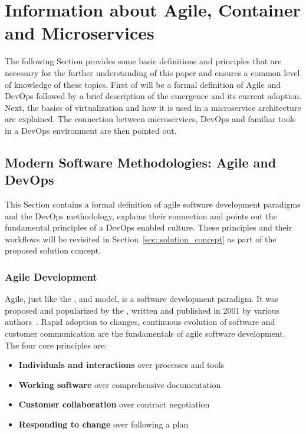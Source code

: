 \documentclass[12pt, a4paper]{article}
\begin{document}
\section{Information about Agile, Container and Microservices}\label{sec::backgrund}
The following Section provides some basic definitions and principles that are necessary for the further understanding of this paper and ensures a common level of knowledge of these topics. First of will be a formal definition of Agile and DevOps followed by a brief description of the emergence and its current adoption. Next, the basics of virtualization and how it is used in a microservice architecture are explained. The connection between microservices, DevOps and familiar tools in a DevOps environment are then pointed out.

    \subsection{Modern Software Methodologies: Agile and DevOps}\label{ssec::devops}
    This Section contains a formal definition of agile software development paradigms and the DevOps methodology, explains their connection and points out the fundamental principles of a DevOps enabled culture. These principles and their workflows will be revisited in Section~\ref{sec::solution_concept} as part of the proposed solution concept.

        \subsubsection{Agile Development}
        Agile, just like the ,  and  model, is a software development paradigm. It was proposed and popularized by the , written and published in 2001 by various authors~\cite{manifesto}. Rapid adoption to changes, continuous evolution of software and customer communication are the fundamentals of agile software development.\newline
        The four core principles are:

        \begin{itemize}[label=\(\star\)]
            \setlength\itemsep{0em}
            \item \textbf{Individuals and interactions} over processes and tools
            \item \textbf{Working software} over comprehensive documentation
            \item \textbf{Customer collaboration} over contract negotiation
            \item \textbf{Responding to change} over following a plan
        \end{itemize}
\end{document}
